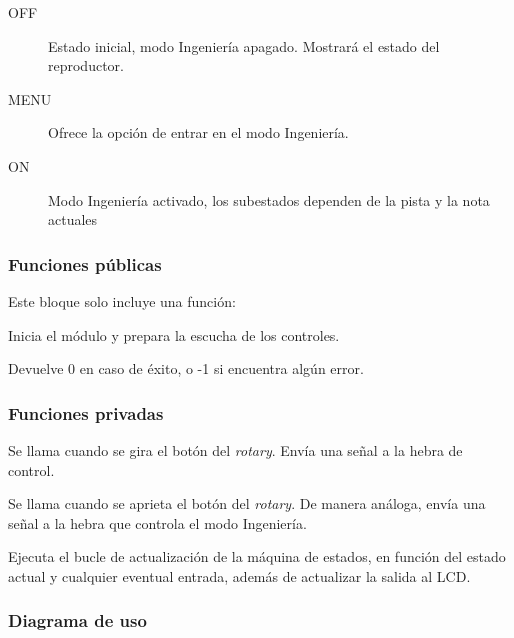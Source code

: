 \smallskip

\begin{description}
	\item[OFF] Estado inicial, modo Ingeniería apagado. Mostrará el estado del reproductor.
	\item[MENU] Ofrece la opción de entrar en el modo Ingeniería.
	\item[ON] Modo Ingeniería activado, los subestados dependen de la pista y la nota actuales
\end{description}

\subsubsection{Funciones públicas}

Este bloque solo incluye una función:

\begin{description}[style=nextline]
	\item[periph\_init () : integer]
	Inicia el módulo y prepara la escucha de los controles.
	
	Devuelve 0 en caso de éxito, o -1 si encuentra algún error.
\end{description}

\subsubsection{Funciones privadas}

\begin{description}[style=nextline]
	\item[rot\_change ()]
	Se llama cuando se gira el botón del \textit{rotary}. Envía una señal a la hebra de control.
	
	\item[rot\_push ()]
	Se llama cuando se aprieta el botón del \textit{rotary}. De manera análoga, envía una señal a la hebra que controla el modo Ingeniería.
	
	\item[periph\_run ()]
	Ejecuta el bucle de actualización de la máquina de estados, en función del estado actual y cualquier eventual entrada, además de actualizar la salida al \acrshort{LCD}.
\end{description}

\subsubsection{Diagrama de uso}

